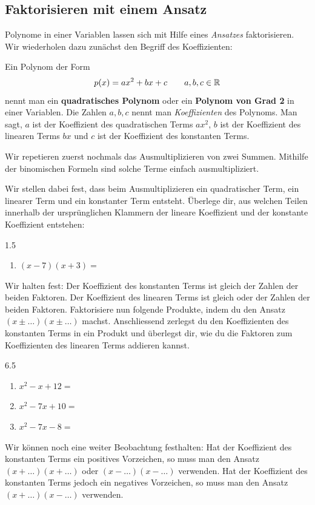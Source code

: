 \documentclass[11pt,oneside]{article}
\begin{document}
\subsection{Faktorisieren mit einem Ansatz}
    Polynome in einer Variablen lassen sich mit Hilfe eines \emph{Ansatzes} faktorisieren. Wir wiederholen dazu zunächst den Begriff des Koeffizienten:
    \begin{definition}
	   Ein Polynom der Form
	   \[p(x) = ax^{2} + bx + c \qquad a,b,c\in\mathbb{R}\]
	   nennt man ein \textbf{quadratisches Polynom} oder ein \textbf{Polynom von Grad 2} in einer Variablen. Die Zahlen $a,b,c$ nennt man \emph{Koeffizienten} des Polynoms. Man sagt, $a$ ist der Koeffizient des quadratischen Terms $ax^{2}$, $b$ ist der Koeffizient des linearen Terms $bx$ und $c$ ist der Koeffizient des konstanten Terms.
    \end{definition}
    Wir repetieren zuerst nochmals das Ausmultiplizieren von zwei Summen. Mithilfe der binomischen Formeln sind solche Terme einfach ausmultipliziert.
    \begin{beispiel}
        Wir stellen dabei fest, dass beim Ausmultiplizieren ein quadratischer Term, ein linearer Term und ein konstanter Term entsteht. Überlege dir, aus welchen Teilen innerhalb der ursprünglichen Klammern der lineare Koeffizient und der konstante Koeffizient entstehen:
         \begin{gridspace}{1.5}
        	\begin{enumerate}[label=\ , leftmargin=1.4cm]
        		\item $(x-7)(x+3)=$
        	\end{enumerate}
        \end{gridspace}
        Wir halten fest: Der Koeffizient des konstanten Terms ist gleich  der Zahlen der beiden Faktoren. Der Koeffizient des linearen Terms ist gleich  oder  der Zahlen der beiden Faktoren. \newline
        Faktorisiere nun folgende Produkte, indem du den Ansatz $ (x \pm \ldots )(x \pm \ldots) $ machst. Anschliessend zerlegst du den Koeffizienten des konstanten Terms in ein Produkt und überlegst dir, wie du die Faktoren zum Koeffizienten des linearen Terms addieren kannst.
        \begin{gridspace}{6.5}
        	\begin{enumerate}[label=\alph*)]
        		\item $x^{2}-x+12 =$\\
        		\item $x^{2}-7x+10 =$\\
        		\item $x^{2}-7x-8 =$
        	\end{enumerate}
        \end{gridspace}

        Wir können noch eine weiter Beobachtung festhalten: Hat der Koeffizient des konstanten Terms ein positives Vorzeichen, so muss man den Ansatz $ (x+ \ldots)(x+\ldots)$ oder $(x-\ldots)(x-\ldots)$ verwenden. Hat der Koeffizient des konstanten Terms jedoch ein negatives Vorzeichen, so muss man den Ansatz $(x+\ldots)(x-\ldots)$ verwenden.
    \end{beispiel}
\end{document}
